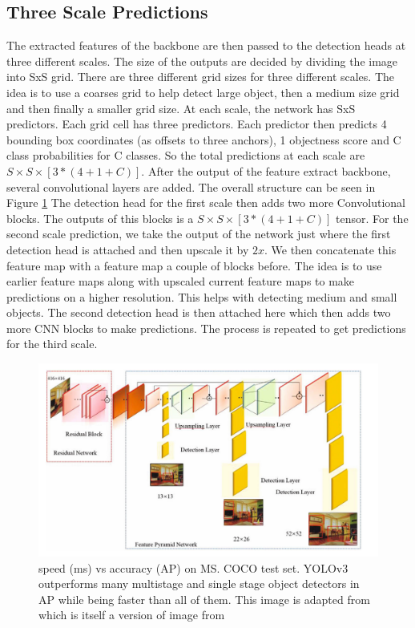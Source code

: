 \documentclass[10pt,twocolumn,letterpaper]{article}
\begin{document}
\subsection{Three Scale Predictions}
The extracted features of the backbone are then passed to the detection heads at three different scales. The size of the outputs are decided by dividing the image into SxS grid. There are three different grid sizes for three different scales. The idea is to use a coarses grid to help detect large object, then a medium size grid and then finally a smaller grid size. At each scale, the network has SxS predictors. Each grid cell has three predictors. Each predictor then predicts 4 bounding box coordinates (as offsets to three anchors), 1 objectness score and C class probabilities for C classes. So the total predictions at each scale are $S\times S\times [3*(4+1+C)]$. 
After the output of the feature extract backbone, several convolutional layers are added. The overall structure can be seen in Figure \ref{fig:detection_head}
The detection head for the first scale then adds two more Convolutional blocks. The outputs of this blocks is a $S\times S\times [3*(4+1+C)]$ tensor. 
For the second scale prediction, we take the output of the network just where the first detection head is attached and then upscale it by $2x$. We then concatenate this feature map with a feature map a couple of blocks before. The idea is to use earlier feature maps along with upscaled current feature maps to make predictions on a higher resolution. This helps with detecting medium and small objects. The second detection head is then attached here which then adds two more CNN blocks to make predictions. The process is repeated to get predictions for the third scale. 


\begin{figure}[t]
	\begin{center}
		\includegraphics[width=1.0\linewidth]{detection_heads.png}
	\end{center}
	\caption{speed (ms) vs accuracy (AP) on MS. COCO test set. YOLOv3 outperforms many multistage and single stage object detectors in AP while being faster than all of them. This image is adapted from \cite{redmon2018yolov3} which is itself a version of image from \cite{retinaNet}}
	\label{fig:detection_head}
\end{figure}
\end{document}
